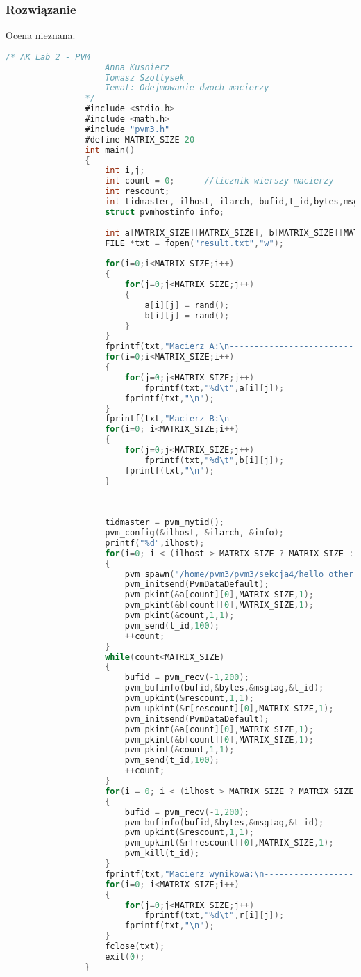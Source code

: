 		\subsubsection{Rozwiązanie}
			Ocena nieznana.
			\begin{lstlisting}[language=C]
				/* AK Lab 2 - PVM
					Anna Kusnierz
					Tomasz Szoltysek
					Temat: Odejmowanie dwoch macierzy
				*/
				#include <stdio.h>
				#include <math.h>
				#include "pvm3.h"
				#define MATRIX_SIZE 20
				int main() 
				{
					int i,j;
					int count = 0; 		//licznik wierszy macierzy
					int rescount;
					int tidmaster, ilhost, ilarch, bufid,t_id,bytes,msgtag;
					struct pvmhostinfo info;
					
					int a[MATRIX_SIZE][MATRIX_SIZE], b[MATRIX_SIZE][MATRIX_SIZE], r[MATRIX_SIZE][MATRIX_SIZE];
					FILE *txt = fopen("result.txt","w");
					
					for(i=0;i<MATRIX_SIZE;i++)
					{
						for(j=0;j<MATRIX_SIZE;j++)
						{
							a[i][j] = rand();
							b[i][j] = rand();
						}
					}
					fprintf(txt,"Macierz A:\n--------------------------------------------------\n\n");
					for(i=0;i<MATRIX_SIZE;i++)
					{
						for(j=0;j<MATRIX_SIZE;j++)
							fprintf(txt,"%d\t",a[i][j]);
						fprintf(txt,"\n");
					}
					fprintf(txt,"Macierz B:\n--------------------------------------------------\n\n");
					for(i=0; i<MATRIX_SIZE;i++)
					{
						for(j=0;j<MATRIX_SIZE;j++)
							fprintf(txt,"%d\t",b[i][j]);
						fprintf(txt,"\n");
					}
					
					
					
					tidmaster = pvm_mytid();
					pvm_config(&ilhost, &ilarch, &info);
					printf("%d",ilhost);
					for(i=0; i < (ilhost > MATRIX_SIZE ? MATRIX_SIZE : ilhost) ;i++)
					{
						pvm_spawn("/home/pvm3/pvm3/sekcja4/hello_other",0,PvmTaskHost,info[i].hi_name,1,&t_id);
						pvm_initsend(PvmDataDefault);
						pvm_pkint(&a[count][0],MATRIX_SIZE,1);
						pvm_pkint(&b[count][0],MATRIX_SIZE,1);
						pvm_pkint(&count,1,1);
						pvm_send(t_id,100);	
						++count;
					}
					while(count<MATRIX_SIZE)
					{
						bufid = pvm_recv(-1,200);
						pvm_bufinfo(bufid,&bytes,&msgtag,&t_id);
						pvm_upkint(&rescount,1,1);
						pvm_upkint(&r[rescount][0],MATRIX_SIZE,1);
						pvm_initsend(PvmDataDefault);
						pvm_pkint(&a[count][0],MATRIX_SIZE,1);
						pvm_pkint(&b[count][0],MATRIX_SIZE,1);
						pvm_pkint(&count,1,1);
						pvm_send(t_id,100);
						++count;
					}
					for(i = 0; i < (ilhost > MATRIX_SIZE ? MATRIX_SIZE : ilhost); i++)
					{
						bufid = pvm_recv(-1,200);
						pvm_bufinfo(bufid,&bytes,&msgtag,&t_id);
						pvm_upkint(&rescount,1,1);
						pvm_upkint(&r[rescount][0],MATRIX_SIZE,1);
						pvm_kill(t_id);	
					}
					fprintf(txt,"Macierz wynikowa:\n--------------------------------------------------\n\n");
					for(i=0; i<MATRIX_SIZE;i++)
					{
						for(j=0;j<MATRIX_SIZE;j++)
							fprintf(txt,"%d\t",r[i][j]);
						fprintf(txt,"\n");
					}
					fclose(txt);
					exit(0);
				}
			\end{lstlisting}
